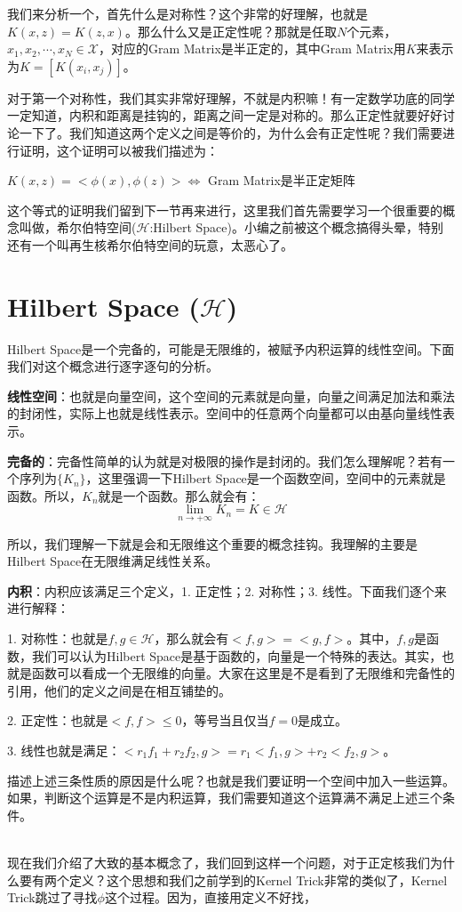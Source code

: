 \documentclass[a4paper]{article}
\begin{document}
我们来分析一个，首先什么是对称性？这个非常的好理解，也就是$K(x,z)=K(z,x)$。那么什么又是正定性呢？那就是任取$N$个元素，$x_1,x_2,\cdots,x_N\in \mathcal{X}$，对应的Gram Matrix是半正定的，其中Gram Matrix用$K$来表示为$K=[K(x_i,x_j)]$。

对于第一个对称性，我们其实非常好理解，不就是内积嘛！有一定数学功底的同学一定知道，内积和距离是挂钩的，距离之间一定是对称的。那么正定性就要好好讨论一下了。我们知道这两个定义之间是等价的，为什么会有正定性呢？我们需要进行证明，这个证明可以被我们描述为：
\begin{center}
    {\color{red}
    $K(x,z) = <\phi(x),\phi(z)> \Longleftrightarrow$ Gram Matrix是半正定矩阵
    }
\end{center}

这个等式的证明我们留到下一节再来进行，这里我们首先需要学习一个很重要的概念叫做，希尔伯特空间($\mathcal{H}$:Hilbert Space)。小编之前被这个概念搞得头晕，特别还有一个叫再生核希尔伯特空间的玩意，太恶心了。

\section{Hilbert Space ($\mathcal{H}$)}
{\color{red} Hilbert Space是一个完备的，可能是无限维的，被赋予内积运算的线性空间。}下面我们对这个概念进行逐字逐句的分析。

\textbf{线性空间}：也就是向量空间，这个空间的元素就是向量，向量之间满足加法和乘法的封闭性，实际上也就是线性表示。空间中的任意两个向量都可以由基向量线性表示。

\textbf{完备的}：完备性简单的认为就是对极限的操作是封闭的。我们怎么理解呢？若有一个序列为$\{K_n\}$，这里强调一下Hilbert Space是一个函数空间，空间中的元素就是函数。所以，$K_n$就是一个函数。那么就会有：
\begin{equation}
    \lim_{n\longrightarrow +\infty} K_n = K \in \mathcal{H}
\end{equation}

所以，我们理解一下就是会和无限维这个重要的概念挂钩。我理解的主要是Hilbert Space在无限维满足线性关系。

\textbf{内积}：内积应该满足三个定义，1. 正定性；2. 对称性；3. 线性。下面我们逐个来进行解释：

1. 对称性：也就是$f,g\in \mathcal{H}$，那么就会有$<f,g> = <g,f>$。其中，$f,g$是函数，我们可以认为Hilbert Space是基于函数的，向量是一个特殊的表达。其实，也就是函数可以看成一个无限维的向量。大家在这里是不是看到了无限维和完备性的引用，他们的定义之间是在相互铺垫的。

2. 正定性：也就是$<f,f> \leq 0$，等号当且仅当$f=0$是成立。

3. 线性也就是满足：$<r_1f_1+r_2f_2, g> = r_1<f_1,g>+r_2<f_2,g>$。

描述上述三条性质的原因是什么呢？也就是我们要证明一个空间中加入一些运算。如果，判断这个运算是不是内积运算，我们需要知道这个运算满不满足上述三个条件。

~\\

现在我们介绍了大致的基本概念了，我们回到这样一个问题，对于正定核我们为什么要有两个定义？这个思想和我们之前学到的Kernel Trick非常的类似了，Kernel Trick跳过了寻找$\phi$这个过程。因为，直接用定义不好找，
\end{document}
